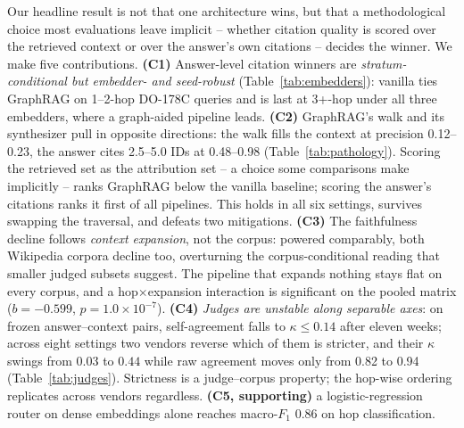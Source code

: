 Our headline result is not that one architecture wins, but that a
methodological choice most evaluations leave implicit -- whether
citation quality is scored over the retrieved context or over the
answer's own citations -- decides the winner. We make five
contributions.
\textbf{(C1)} Answer-level citation winners are
\emph{stratum-conditional but embedder- and seed-robust}
(Table~\ref{tab:embedders}): vanilla ties GraphRAG on 1--2-hop DO-178C
queries and is last at 3+-hop under all three embedders, where a
graph-aided pipeline leads.
\textbf{(C2)} GraphRAG's walk and its synthesizer pull in opposite
directions: the walk fills the context at precision 0.12--0.23, the
answer cites 2.5--5.0 IDs at 0.48--0.98
(Table~\ref{tab:pathology}). Scoring the retrieved set as the
attribution set -- a choice some comparisons make implicitly -- ranks
GraphRAG below the vanilla baseline; scoring the answer's citations
ranks it first of all pipelines. This holds in all six settings,
survives swapping the traversal, and defeats two mitigations.
\textbf{(C3)} The faithfulness decline follows \emph{context
expansion}, not the corpus: powered comparably, both Wikipedia corpora
decline too, overturning the corpus-conditional reading that
smaller judged subsets suggest. The pipeline that expands nothing stays flat on every corpus,
and a hop$\times$expansion interaction is significant on the pooled
matrix ($b{=}{-}0.599$, $p{=}1.0{\times}10^{-7}$).
\textbf{(C4)} \emph{Judges are unstable along separable axes}: on
frozen answer--context pairs, self-agreement falls to
$\kappa{\leq}0.14$ after eleven weeks; across eight settings two vendors
reverse which of them is stricter, and their $\kappa$ swings from $0.03$
to $0.44$ while raw agreement moves only from 0.82 to 0.94
(Table~\ref{tab:judges}). Strictness is a judge--corpus property; the
hop-wise ordering replicates across vendors regardless.
\textbf{(C5, supporting)} a logistic-regression router on dense embeddings
alone reaches macro-$F_1$ $0.86$ on hop classification.
